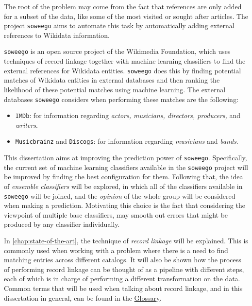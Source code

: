 \documentclass[epsfig,a4paper,11pt,titlepage,twoside,openany]{book}
\newcommand{\soweego}[0]{\texttt{soweego}\xspace}
\begin{document}
The root of the problem may come from the fact that references are only added for a subset of the data, like some of the most visited or sought after articles. The project \soweego aims to automate this task by automatically adding external references to Wikidata information. 

\soweego is an open source project of the Wikimedia Foundation, which uses techniques of record linkage together with machine learning classifiers to find the external references for Wikidata entities. \soweego does this by finding potential matches of Wikidata entities in external databases and then ranking the likelihood of these potential matches using machine learning. The external databases \soweego considers when performing these matches are the following:

\begin{itemize}
    \item \texttt{IMDb}: for information regarding \textit{actors, musicians, directors, producers,} and \textit{writers}.
    \item \texttt{Musicbrainz} and \texttt{Discogs}: for information regarding \textit{musicians} and \textit{bands}.
\end{itemize}

This dissertation aims at improving the prediction power of \soweego. Specifically, the current set of machine learning classifiers available in the \soweego project will be improved by finding the best configuration for them. Following that, the idea of \textit{ensemble classifiers} will be explored, in which all of the classifiers available in \soweego will be joined, and the \textit{opinion} of the whole group will be considered when making a prediction. Motivating this choice is the fact that considering the viewpoint of multiple base classifiers, may smooth out errors that might be produced by any classifier individually. 

In \autoref{chap:state-of-the-art}, the technique of \textit{record linkage} will be explained. This is commonly used when working with a problem where there is a need to find matching entries across different catalogs. It will also be shown how the process of performing record linkage can be thought of as a pipeline with different steps, each of which is in charge of performing a different transformation on the data. Common terms that will be used when talking about record linkage, and in this dissertation in general, can be found in the \hyperref[sec:apx-glossary]{Glossary}.
\end{document}

